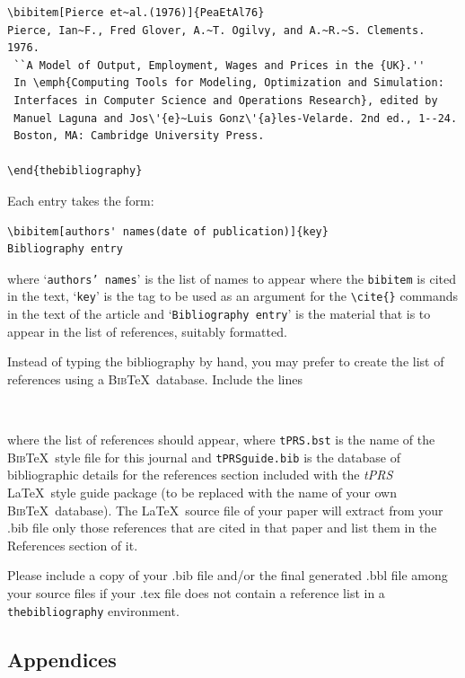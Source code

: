 \documentclass{tPRS2e}
\begin{document}
\begin{verbatim}
\bibitem[Pierce et~al.(1976)]{PeaEtAl76}
Pierce, Ian~F., Fred Glover, A.~T. Ogilvy, and A.~R.~S. Clements. 1976.
 ``A Model of Output, Employment, Wages and Prices in the {UK}.''
 In \emph{Computing Tools for Modeling, Optimization and Simulation:
 Interfaces in Computer Science and Operations Research}, edited by
 Manuel Laguna and Jos\'{e}~Luis Gonz\'{a}les-Velarde. 2nd ed., 1--24.
 Boston, MA: Cambridge University Press.

\end{thebibliography}
\end{verbatim}
\bigskip
\noindent Each entry takes the form:
\begin{verbatim}
\bibitem[authors' names(date of publication)]{key}
Bibliography entry
\end{verbatim}
\noindent where `\texttt{authors' names}' is the list of names to appear where the \verb"bibitem" is cited in the text, `\texttt{key}' is the tag to be used as an argument for the \verb"\cite{}" commands in the text of the article and `\texttt{Bibliography entry}' is the material that is to appear in the list of references, suitably formatted.

Instead of typing the bibliography by hand, you may prefer to create the list of references using a \textsc{Bib}\TeX\ database. Include the lines
\begin{verbatim}


\end{verbatim}
where the list of references should appear, where \texttt{tPRS.bst} is the name of the \textsc{Bib}\TeX\ style file for this journal and \texttt{tPRSguide.bib} is the database of bibliographic details for the references section included with the \textit{tPRS} \LaTeX\ style guide package (to be replaced with the name of your own \textsc{Bib}\TeX\ database). The \LaTeX\ source file of your paper will extract from your .bib file only those references that are cited in that paper and list them in the References section of it.

Please include a copy of your .bib file and/or the final generated .bbl file among your source files if your .tex file does not contain a reference list in a \texttt{thebibliography} environment.


\subsection{Appendices}\label{appendices}
\end{document}
